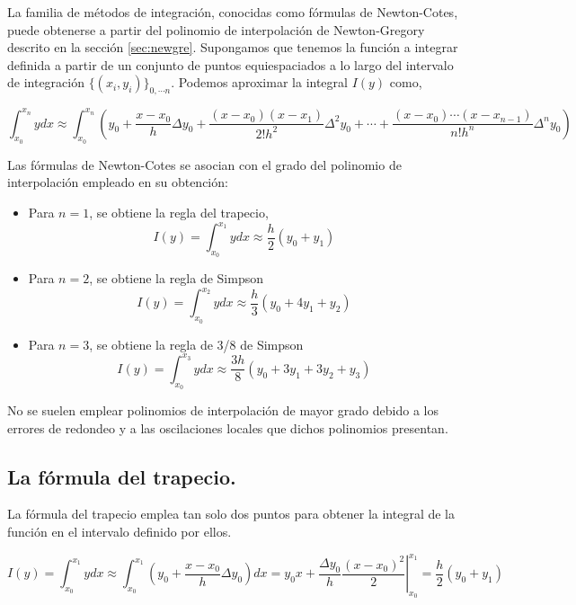 La familia de métodos de integración, conocidas como fórmulas de Newton-Cotes, puede obtenerse a partir del polinomio de interpolación de Newton-Gregory descrito en la sección \ref{sec:newgre}. Supongamos que tenemos la función a integrar definida a partir de un conjunto de puntos equiespaciados a lo largo del intervalo de integración $\{(x_i,y_i)\}_{0,\cdots n}$. Podemos aproximar la integral $I(y)$ como,

\begin{equation*}
\int_{x_0}^{x_n}ydx \approx \int_{x_0}^{x_n}\left(y_0+\frac{x-x_0}{h}\Delta y_0+\frac{(x-x_0)(x-x_1)}{2!h^2}\Delta ^2 y_0+\cdots +\frac{(x-x_0)\cdots(x-x_{n-1})}{n!h^n}\Delta^n y_0 \right)
\end{equation*}

Las fórmulas de Newton-Cotes se asocian con el grado del polinomio de interpolación empleado en su obtención:

\begin{itemize}
\item Para $n=1$, se obtiene la regla del trapecio,
\begin{equation*}
I(y)=\int_{x_0}^{x_1}ydx \approx \frac{h}{2}(y_0+y_1)
\end{equation*}
\item Para $n=2$, se obtiene la regla de Simpson 
\begin{equation*}
I(y)=\int_{x_0}^{x_2}ydx \approx \frac{h}{3}(y_0+4y_1+y_2)
\end{equation*}
\item Para $n=3$, se obtiene la regla de 3/8 de Simpson
\begin{equation*}
I(y)=\int_{x_0}^{x_3}ydx \approx \frac{3h}{8}(y_0+3y_1+3y_2+y_3)
\end{equation*}
\end{itemize}

No se suelen emplear polinomios de interpolación de mayor grado debido a los errores de redondeo y a las oscilaciones locales que dichos polinomios presentan.
 
\subsection{La fórmula del trapecio.}

La fórmula del trapecio emplea tan solo dos puntos para obtener la integral de la función en el intervalo definido por ellos. 

\begin{equation*}
I(y)=\int_{x_0}^{x_1}ydx \approx \int_{x_0}^{x_1}\left(y_0+\frac{x-x_0}{h}\Delta y_0\right)dx =y_0x+\left. \frac{\Delta y_0}{h}\frac{(x-x_0)^2}{2} \right\rvert_{x_0}^{x_1}=\frac{h}{2}(y_0+y_1)
\end{equation*}

